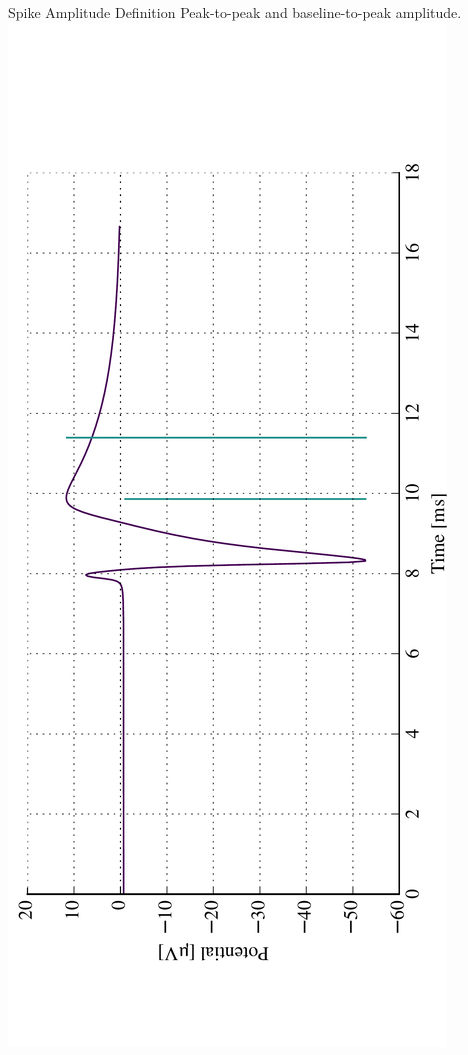 \documentclass{beamer}
\begin{document}
\begin{frame}{Spike Amplitude Definition}
    Peak-to-peak and baseline-to-peak amplitude.
    \centering
    \includegraphics[angle=-90,width=\textwidth]{images/amp_def.pdf}
\end{frame}
\end{document}
